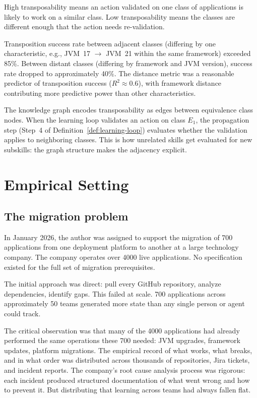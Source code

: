 \documentclass[11pt]{article}
\theoremstyle{definition}
\begin{document}
High transposability means an action validated on one class of
applications is likely to work on a similar class. Low transposability
means the classes are different enough that the action needs
re-validation.

Transposition success rate between adjacent classes (differing by one
characteristic, e.g., JVM~17 $\to$ JVM~21 within the same framework)
exceeded 85\%. Between distant classes (differing by framework and JVM
version), success rate dropped to approximately 40\%. The distance
metric was a reasonable predictor of transposition success
($R^2 \approx 0.6$), with framework distance contributing more
predictive power than other characteristics.

The knowledge graph encodes transposability as edges between equivalence
class nodes. When the learning loop validates an action on class $E_1$,
the propagation step (Step~4 of Definition~\ref{def:learning-loop})
evaluates whether the validation applies to neighboring classes. This
is how unrelated skills get evaluated for new subskills: the graph
structure makes the adjacency explicit.

\section{Empirical Setting}
\label{sec:empirical}

\subsection{The migration problem}

In January 2026, the author was assigned to support the migration of
700 applications from one deployment platform to another at a large
technology company. The company operates over 4000 live applications.
No specification existed for the full set of migration prerequisites.

The initial approach was direct: pull every GitHub repository, analyze
dependencies, identify gaps. This failed at scale. 700 applications
across approximately 50 teams generated more state than any single
person or agent could track.

The critical observation was that many of the 4000 applications had
already performed the same operations these 700 needed: JVM upgrades,
framework updates, platform migrations. The empirical record of what
works, what breaks, and in what order was distributed across thousands
of repositories, Jira tickets, and incident reports. The company's
root cause analysis process was rigorous: each incident produced
structured documentation of what went wrong and how to prevent it. But
distributing that learning across teams had always fallen flat.
\end{document}
